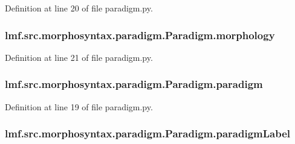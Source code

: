 Definition at line 20 of file paradigm.\+py.

\hypertarget{classlmf_1_1src_1_1morphosyntax_1_1paradigm_1_1_paradigm_a7c9c944b764a0351f0e58234b48bdf86}{
\subsubsection[{morphology}]{\setlength{\rightskip}{0pt plus 5cm}lmf.\+src.\+morphosyntax.\+paradigm.\+Paradigm.\+morphology}}\label{classlmf_1_1src_1_1morphosyntax_1_1paradigm_1_1_paradigm_a7c9c944b764a0351f0e58234b48bdf86}


Definition at line 21 of file paradigm.\+py.

\hypertarget{classlmf_1_1src_1_1morphosyntax_1_1paradigm_1_1_paradigm_a2c706c0653324f536c9fc8b20d5dbf15}{
\subsubsection[{paradigm}]{\setlength{\rightskip}{0pt plus 5cm}lmf.\+src.\+morphosyntax.\+paradigm.\+Paradigm.\+paradigm}}\label{classlmf_1_1src_1_1morphosyntax_1_1paradigm_1_1_paradigm_a2c706c0653324f536c9fc8b20d5dbf15}


Definition at line 19 of file paradigm.\+py.

\hypertarget{classlmf_1_1src_1_1morphosyntax_1_1paradigm_1_1_paradigm_a5892a515d2311d4c03b180603a0d2929}{
\subsubsection[{paradigm\+Label}]{\setlength{\rightskip}{0pt plus 5cm}lmf.\+src.\+morphosyntax.\+paradigm.\+Paradigm.\+paradigm\+Label}}\label{classlmf_1_1src_1_1morphosyntax_1_1paradigm_1_1_paradigm_a5892a515d2311d4c03b180603a0d2929}


